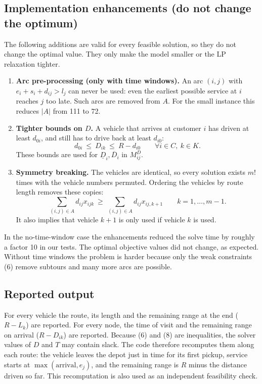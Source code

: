 \documentclass[11pt,a4paper]{article}
\theoremstyle{definition}
\newcommand{\sumA}{\sum_{(i,j)\in A}}
\begin{document}
\subsection{Implementation enhancements (do not change the optimum)}\label{sec:impl}
The following additions are valid for every feasible solution, so they do not change the optimal value. They only make the model smaller or the LP relaxation tighter.
\begin{enumerate}
\item \textbf{Arc pre-processing (only with time windows).} An arc $(i,j)$ with $e_i+s_i+d_{ij}>l_j$ can never be used: even the earliest possible service at $i$ reaches $j$ too late. Such arcs are removed from $A$. For the small instance this reduces $|A|$ from 111 to 72.
\item \textbf{Tighter bounds on $D$.} A vehicle that arrives at customer $i$ has driven at least $d_{0i}$, and still has to drive back at least $d_{i0}$:
\[ d_{0i}\ \le\ D_{ik}\ \le\ R-d_{i0}\qquad\forall i\in C,\ k\in K. \]
These bounds are used for $\underline D_i,\overline D_i$ in $M^D_{ij}$.
\item \textbf{Symmetry breaking.} The vehicles are identical, so every solution exists $m!$ times with the vehicle numbers permuted. Ordering the vehicles by route length removes these copies:
\[ \sumA d_{ij}x_{ijk}\ \ge\ \sumA d_{ij}x_{ij,k+1}\qquad k=1,\dots,m-1. \tag{SB}\]
It also implies that vehicle $k+1$ is only used if vehicle $k$ is used.
\end{enumerate}
\begin{notebox}
In the no-time-window case the enhancements reduced the solve time by roughly a factor 10 in our tests. The optimal objective values did not change, as expected. Without time windows the problem is harder because only the weak constraints (6) remove subtours and many more arcs are possible.
\end{notebox}

\subsection{Reported output}
For every vehicle the route, its length and the remaining range at the end ($R-L_k$) are reported. For every node, the time of visit and the remaining range on arrival ($R-D_{ik}$) are reported. Because (6) and (8) are inequalities, the solver values of $D$ and $T$ may contain slack. The code therefore recomputes them along each route: the vehicle leaves the depot just in time for its first pickup, service starts at $\max(\text{arrival},e_j)$, and the remaining range is $R$ minus the distance driven so far. This recomputation is also used as an independent feasibility check.
\end{document}
